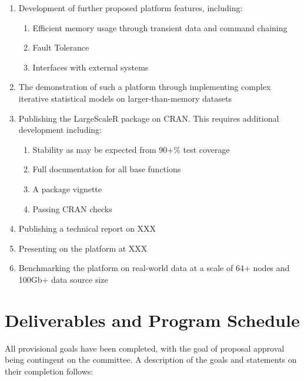 \documentclass[a4paper,10pt]{article}
\begin{document}
\begin{enumerate}
	\item Development of further proposed platform features, including:
		\begin{enumerate}
			\item Efficient memory usage through transient data and command chaining
			\item Fault Tolerance
			\item Interfaces with external systems
		\end{enumerate}
	\item The demonstration of such a platform through implementing complex iterative statistical models on larger-than-memory datasets
	\item Publishing the LargeScaleR package on CRAN. This requires additional development including:
		\begin{enumerate}
			\item Stability as may be expected from 90+\% test coverage
			\item Full documentation for all base functions
			\item A package vignette
			\item Passing CRAN checks
		\end{enumerate}
	\item Publishing a technical report on XXX
	\item Presenting on the platform at XXX
	\item Benchmarking the platform on real-world data at a scale of 64+ nodes and 100Gb+ data source size
\end{enumerate}

\section{Deliverables and Program Schedule}

All provisional goals have been completed, with the goal of proposal approval being contingent on the committee.
A description of the goals and statements on their completion follows:
\end{document}

